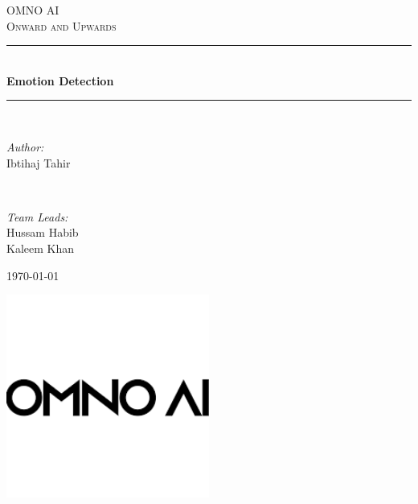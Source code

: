 \documentclass[11pt]{article}
\begin{document}
	
	\begin{titlepage}
		\newcommand{\HRule}{\rule{\linewidth}{0.5mm}}
		
		\centering
		
		\textsc{\LARGE OMNO AI}\\[0.5cm]
		
		\textsc{\Large Onward and Upwards}\\[1.5cm]
		
		\HRule\\[0.4cm]
		
		{\huge\bfseries Emotion Detection}\\[0.4cm]
		
		\HRule\\[1.5cm]
		
		\begin{minipage}{0.4\textwidth}
			\begin{flushleft}
				\large
				\textit{Author:}\\
				Ibtihaj Tahir
			\end{flushleft}
		\end{minipage}
		~
		\begin{minipage}{0.4\textwidth}
			\begin{flushright}
				\large
				\textit{Team Leads:}\\
				Hussam Habib\\
				Kaleem Khan
			\end{flushright}
		\end{minipage}
		
		\vfill\vfill\vfill
		
		{\large\today}
		
		\vfill\vfill\vfill
		\includegraphics[width=0.5\textwidth]{logo.png}\\[1cm]
		
	\end{titlepage}
\end{document}
